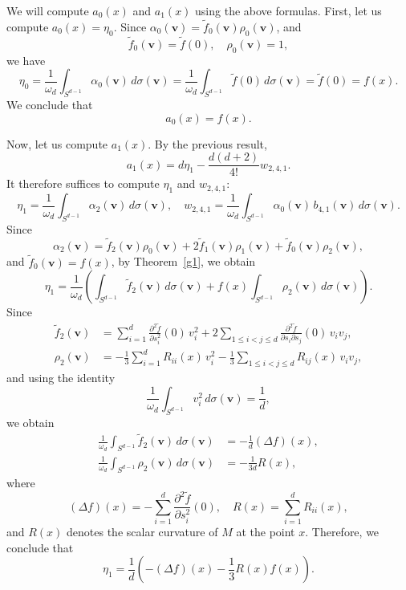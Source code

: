 \documentclass{amsart}
\theoremstyle{Theorem}
\theoremstyle{remark}
\numberwithin{equation}{section} \numberwithin{figure}{section}
\begin{document}
We will compute \( a_0(x) \) and \( a_1(x) \) using the above formulas. First, let us compute \( a_0(x) = \eta_0 \). Since \( \alpha_0(\mathbf{v}) = \widetilde{f}_0(\mathbf{v}) \rho_0(\mathbf{v}) \), and
\[
\widetilde{f}_0(\mathbf{v}) = \widetilde{f}(0), \quad \rho_0(\mathbf{v}) = 1,
\]
we have
\[
\eta_0 = \frac{1}{\omega_d} \int_{S^{d-1}} \alpha_0(\mathbf{v}) \, d\sigma(\mathbf{v}) 
= \frac{1}{\omega_d} \int_{S^{d-1}} \widetilde{f}(0) \, d\sigma(\mathbf{v}) 
= \widetilde{f}(0) = f(x).
\]
We conclude that
\[
a_0(x) = f(x).
\]

Now, let us compute \( a_1(x) \). By the previous result,
\[
a_1(x) = d \eta_1 - \frac{d(d+2)}{4!} w_{2,4,1}.
\]
It therefore suffices to compute \( \eta_1 \) and \( w_{2,4,1} \):
\[
\eta_1 = \frac{1}{\omega_d} \int_{S^{d-1}} \alpha_2(\mathbf{v}) \, d\sigma(\mathbf{v}), \quad
w_{2,4,1} = \frac{1}{\omega_d} \int_{S^{d-1}} \alpha_0(\mathbf{v}) \, b_{4,1}(\mathbf{v}) \, d\sigma(\mathbf{v}).
\]
Since
\[
\alpha_2(\mathbf{v}) = \widetilde{f}_2(\mathbf{v}) \rho_0(\mathbf{v}) + 2 \widetilde{f}_1(\mathbf{v}) \rho_1(\mathbf{v}) + \widetilde{f}_0(\mathbf{v}) \rho_2(\mathbf{v}),
\]
and \( \widetilde{f}_0(\mathbf{v}) = f(x) \), by Theorem~\ref{g1}, we obtain
\[
\eta_1 = \frac{1}{\omega_d} \left( \int_{S^{d-1}} \widetilde{f}_2(\mathbf{v}) \, d\sigma(\mathbf{v}) + f(x) \int_{S^{d-1}} \rho_2(\mathbf{v}) \, d\sigma(\mathbf{v}) \right).
\]
Since
\begin{align*}
\widetilde{f}_2(\mathbf{v}) &= \sum_{i=1}^{d} \frac{\partial^2 \widetilde{f}}{\partial s_i^2}(0) \, v_i^2
+ 2 \sum_{1 \leq i < j \leq d} \frac{\partial^2 \widetilde{f}}{\partial s_i \partial s_j}(0) \, v_i v_j, \\
\rho_2(\mathbf{v}) &=  -\frac{1}{3} \sum_{i=1}^{d} R_{ii}(x) \, v_i^2
- \frac{1}{3} \sum_{1 \leq i < j \leq d} R_{ij}(x) \, v_i v_j,
\end{align*}
and using the identity
\[
\frac{1}{\omega_d} \int_{S^{d-1}} v_i^2 \, d\sigma(\mathbf{v}) = \frac{1}{d},
\]
we obtain
\begin{align*}
\frac{1}{\omega_d} \int_{S^{d-1}} \widetilde{f}_2(\mathbf{v}) \, d\sigma(\mathbf{v}) &= -\frac{1}{d} (\Delta f)(x), \\
\frac{1}{\omega_d} \int_{S^{d-1}} \rho_2(\mathbf{v}) \, d\sigma(\mathbf{v}) &= -\frac{1}{3d} R(x),
\end{align*}
where
\[
(\Delta f)(x) = -\sum_{i=1}^{d} \frac{\partial^2 \widetilde{f}}{\partial s_i^2}(0), \quad
R(x) = \sum_{i=1}^{d} R_{ii}(x),
\]
and \( R(x) \) denotes the scalar curvature of \( M \) at the point \( x \). Therefore, we conclude that
\[
\eta_1 = \frac{1}{d} \left( -(\Delta f)(x) - \frac{1}{3} R(x) f(x) \right).
\]
\end{document}
